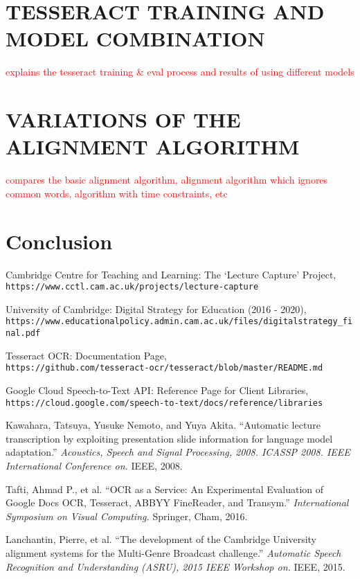 \documentclass[12pt]{article}
\begin{document}
\section{TESSERACT TRAINING AND MODEL COMBINATION}

\textcolor{red}{explains the tesseract training \& eval process and results of using different models}

\section{VARIATIONS OF THE ALIGNMENT ALGORITHM}

\textcolor{red}{compares the basic alignment algorithm, alignment algorithm which ignores common words, algorithm with time constraints, etc}

\section{Conclusion}

\begin{thebibliography}{9}

Cambridge Centre for Teaching and Learning: The `Lecture Capture' Project,
\\ \texttt{https://www.cctl.cam.ac.uk/projects/lecture-capture}

University of Cambridge: Digital Strategy for Education (2016 - 2020),
\\ \texttt{https://www.educationalpolicy.admin.cam.ac.uk/files/digitalstrategy\_final.pdf}
    
Tesseract OCR: Documentation Page,
\\ \texttt{https://github.com/tesseract-ocr/tesseract/blob/master/README.md}

Google Cloud Speech-to-Text API: Reference Page for Client Libraries,
\\ \texttt{https://cloud.google.com/speech-to-text/docs/reference/libraries}

Kawahara, Tatsuya, Yusuke Nemoto, and Yuya Akita. ``Automatic lecture transcription by exploiting presentation slide information for language model adaptation.'' \textit{Acoustics, Speech and Signal Processing, 2008. ICASSP 2008. IEEE International Conference on.} IEEE, 2008.

Tafti, Ahmad P., et al. ``OCR as a Service: An Experimental Evaluation of Google Docs OCR, Tesseract, ABBYY FineReader, and Transym.'' \textit{International Symposium on Visual Computing.} Springer, Cham, 2016.

Lanchantin, Pierre, et al. ``The development of the Cambridge University alignment systems for the Multi-Genre Broadcast challenge.'' \textit{Automatic Speech Recognition and Understanding (ASRU), 2015 IEEE Workshop on.} IEEE, 2015.

\end{thebibliography}
\end{document}
